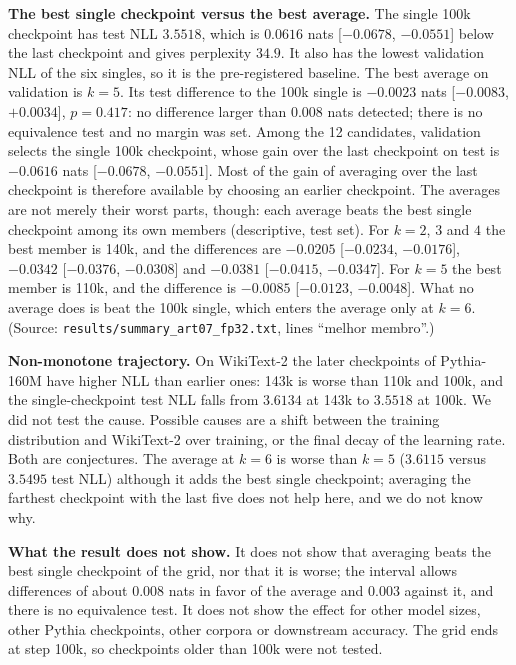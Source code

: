 \documentclass[conference]{IEEEtran}
\begin{document}
\textbf{The best single checkpoint versus the best average.} The single 100k checkpoint has test NLL $3.5518$, which is $0.0616$ nats [$-0.0678$, $-0.0551$] below the last checkpoint and gives perplexity $34.9$. It also has the lowest validation NLL of the six singles, so it is the pre-registered baseline. The best average on validation is $k=5$. Its test difference to the 100k single is $-0.0023$ nats [$-0.0083$, $+0.0034$], $p=0.417$: no difference larger than $0.008$ nats detected; there is no equivalence test and no margin was set. Among the 12 candidates, validation selects the single 100k checkpoint, whose gain over the last checkpoint on test is $-0.0616$ nats [$-0.0678$, $-0.0551$]. Most of the gain of averaging over the last checkpoint is therefore available by choosing an earlier checkpoint. The averages are not merely their worst parts, though: each average beats the best single checkpoint among its own members (descriptive, test set). For $k=2$, $3$ and $4$ the best member is 140k, and the differences are $-0.0205$ [$-0.0234$, $-0.0176$], $-0.0342$ [$-0.0376$, $-0.0308$] and $-0.0381$ [$-0.0415$, $-0.0347$]. For $k=5$ the best member is 110k, and the difference is $-0.0085$ [$-0.0123$, $-0.0048$]. What no average does is beat the 100k single, which enters the average only at $k=6$. (Source: \texttt{results/summary\_art07\_fp32.txt}, lines ``melhor membro''.)

\textbf{Non-monotone trajectory.} On WikiText-2 the later checkpoints of Pythia-160M have higher NLL than earlier ones: 143k is worse than 110k and 100k, and the single-checkpoint test NLL falls from $3.6134$ at 143k to $3.5518$ at 100k. We did not test the cause. Possible causes are a shift between the training distribution and WikiText-2 over training, or the final decay of the learning rate. Both are conjectures. The average at $k=6$ is worse than $k=5$ ($3.6115$ versus $3.5495$ test NLL) although it adds the best single checkpoint; averaging the farthest checkpoint with the last five does not help here, and we do not know why.

\textbf{What the result does not show.} It does not show that averaging beats the best single checkpoint of the grid, nor that it is worse; the interval allows differences of about $0.008$ nats in favor of the average and $0.003$ against it, and there is no equivalence test. It does not show the effect for other model sizes, other Pythia checkpoints, other corpora or downstream accuracy. The grid ends at step 100k, so checkpoints older than 100k were not tested.
\end{document}
